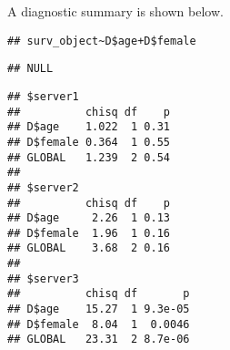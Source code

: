 \documentclass[
]{book}
\begin{document}
A diagnostic summary is shown below.

\begin{verbatim}
## surv_object~D$age+D$female
\end{verbatim}

\begin{verbatim}
## NULL
\end{verbatim}

\begin{verbatim}
## $server1
##          chisq df    p
## D$age    1.022  1 0.31
## D$female 0.364  1 0.55
## GLOBAL   1.239  2 0.54
## 
## $server2
##          chisq df    p
## D$age     2.26  1 0.13
## D$female  1.96  1 0.16
## GLOBAL    3.68  2 0.16
## 
## $server3
##          chisq df       p
## D$age    15.27  1 9.3e-05
## D$female  8.04  1  0.0046
## GLOBAL   23.31  2 8.7e-06
\end{verbatim}
\end{document}

